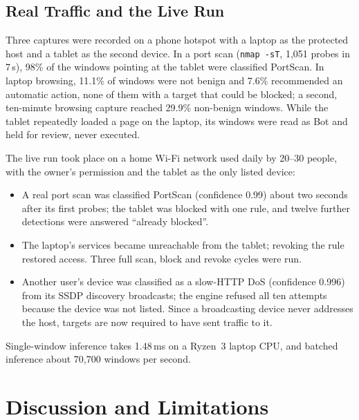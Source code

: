 \documentclass[conference]{IEEEtran}
\begin{document}
\subsection{Real Traffic and the Live Run}
Three captures were recorded on a phone hotspot with a laptop as the protected
host and a tablet as the second device. In a port scan (\texttt{nmap -sT},
1{,}051 probes in 7\,s), 98\% of the windows pointing at the tablet were
classified PortScan. In laptop browsing, 11.1\% of windows were not benign and
7.6\% recommended an automatic action, none of them with a target that could
be blocked; a second, ten-minute browsing capture reached 29.9\% non-benign
windows. While the tablet repeatedly loaded a page on the laptop, its windows
were read as Bot and held for review, never executed.

The live run took place on a home Wi-Fi network used daily by 20--30 people,
with the owner's permission and the tablet as the only listed device:

\begin{itemize}
\item A real port scan was classified PortScan (confidence 0.99) about two
seconds after its first probes; the tablet was blocked with one rule, and
twelve further detections were answered ``already blocked''.
\item The laptop's services became unreachable from the tablet; revoking the
rule restored access. Three full scan, block and revoke cycles were run.
\item Another user's device was classified as a slow-HTTP DoS (confidence
0.996) from its SSDP discovery broadcasts; the engine refused all ten attempts
because the device was not listed. Since a broadcasting device never addresses
the host, targets are now required to have sent traffic to it.
\end{itemize}

Single-window inference takes 1.48\,ms on a Ryzen~3 laptop CPU, and batched
inference about 70{,}700 windows per second.

\section{Discussion and Limitations}
\end{document}

